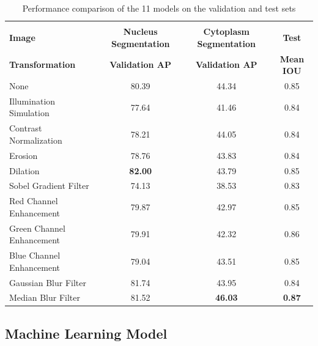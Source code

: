 \documentclass{article}
\begin{document}
\begin{table}[b]
  \caption{Performance comparison of the 11 models on the validation and test sets}
  \label{sample-table}
  \centering
  \begin{tabular}{lccc}
    \toprule
    \multicolumn{2}{c}{ }\\
    {\bf Image} & {\bf Nucleus Segmentation} & {\bf Cytoplasm Segmentation} & {\bf Test} \\
    {\bf Transformation} & {\bf Validation AP} & {\bf Validation AP} & {\bf Mean IOU}   \\
    \midrule
    None & 80.39 & 44.34 & 0.85 \\
    \midrule
    Illumination Simulation & 77.64 & 41.46 & 0.84 \\
    \midrule
    Contrast Normalization & 78.21 & 44.05 & 0.84 \\
    \midrule
    Erosion & 78.76 & 43.83 & 0.84 \\
    \midrule
    Dilation & {\bf 82.00} & 43.79 & 0.85 \\
    \midrule
    Sobel Gradient Filter & 74.13 & 38.53 & 0.83 \\
    \midrule
    Red Channel Enhancement & 79.87 & 42.97 & 0.85 \\
    \midrule
    Green Channel Enhancement & 79.91 & 42.32 & 0.86 \\
    \midrule
    Blue Channel Enhancement & 79.04 & 43.51 & 0.85 \\
    \midrule
    Gaussian Blur Filter & 81.74 & 43.95 & 0.84 \\
    \midrule
    Median Blur Filter & 81.52 & {\bf 46.03} & {\bf 0.87} \\
   \bottomrule
 \end{tabular}
\end{table}

\subsection{Machine Learning Model}
\end{document}
